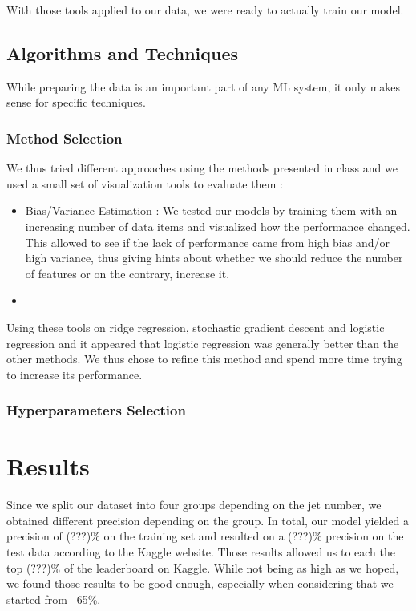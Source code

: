 \documentclass[10pt,conference,compsocconf]{IEEEtran}
\begin{document}
With those tools applied to our data, we were ready to actually  train our model.

\subsection{Algorithms and Techniques}
While preparing the data is an important part of any ML system, it only makes sense for specific techniques. 
\subsubsection{Method Selection}
We thus tried different approaches using the methods presented in class and we used a small set of visualization tools to evaluate them :
\begin{itemize}
\item Bias/Variance Estimation :
We tested our models by training them with an increasing number of data items and visualized how the performance changed. This allowed to see if the lack of performance came from high bias and/or high variance, thus giving hints about whether we should reduce the number of features or on the contrary, increase it.

\item 
\end{itemize}

Using these tools on ridge regression, stochastic gradient descent and logistic regression and it appeared that logistic regression was generally better than the other methods. We thus chose to refine this method
and spend more time trying to increase its performance. 
\subsubsection{Hyperparameters Selection}


\section{Results}
 Since we split our dataset into four groups depending on the jet number, we obtained different precision depending on the group. In total, our model yielded a precision of (???)\% on the training set and resulted on a (???)\% precision on the test data according to the Kaggle website. Those results allowed us to each the top (???)\% of the leaderboard on Kaggle. While not being as high as we hoped, we found those results to be good enough, especially when considering that we started from ~65\%.
\end{document}
